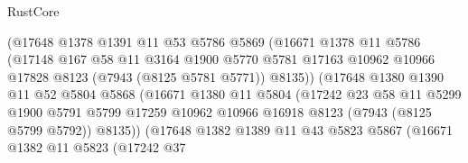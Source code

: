 \begin{lexlean}{RustCore}
\begin{coremodule}
                            (@17648
                              @1378
                              @1391
                              @11
                              @53
                              @5786
                              @5869
                              (@16671
                                @1378
                                @11
                                @5786
                                (@17148
                                  @167
                                  @58
                                  @11
                                  @3164
                                  @1900
                                  @5770
                                  @5781
                                  @17163
                                  @10962
                                  @10966
                                  @17828
                                  @8123
                                  (@7943 (@8125 @5781 @5771))
                                  @8135))
                              (@17648
                                @1380
                                @1390
                                @11
                                @52
                                @5804
                                @5868
                                (@16671
                                  @1380
                                  @11
                                  @5804
                                  (@17242
                                    @23
                                    @58
                                    @11
                                    @5299
                                    @1900
                                    @5791
                                    @5799
                                    @17259
                                    @10962
                                    @10966
                                    @16918
                                    @8123
                                    (@7943 (@8125 @5799 @5792))
                                    @8135))
                                (@17648
                                  @1382
                                  @1389
                                  @11
                                  @43
                                  @5823
                                  @5867
                                  (@16671
                                    @1382
                                    @11
                                    @5823
                                    (@17242
                                      @37

\end{coremodule}
\end{lexlean}
